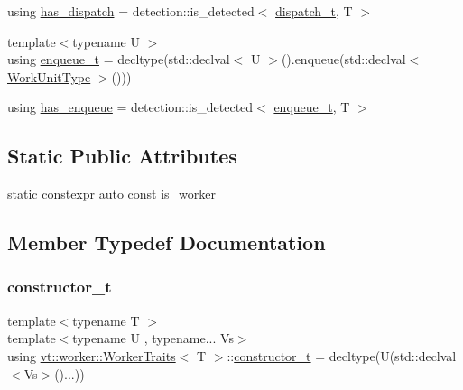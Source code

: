 \begin{DoxyCompactItemize}
\item 
using \hyperlink{structvt_1_1worker_1_1_worker_traits_adb7da9b18b2db529e85ed5a53ca0b0ea}{has\+\_\+dispatch} = detection\+::is\+\_\+detected$<$ \hyperlink{structvt_1_1worker_1_1_worker_traits_ae3d04fe828e40c570a63b969b982e5d4}{dispatch\+\_\+t}, T $>$
\item 
{\footnotesize template$<$typename U $>$ }\\using \hyperlink{structvt_1_1worker_1_1_worker_traits_a017de8e435dfce71e241f5288e199454}{enqueue\+\_\+t} = decltype(std\+::declval$<$ U $>$().enqueue(std\+::declval$<$ \hyperlink{namespacevt_1_1worker_a59d2fcdafa81fc0af7f921a258e42202}{Work\+Unit\+Type} $>$()))
\item 
using \hyperlink{structvt_1_1worker_1_1_worker_traits_acca4e6684b4853e34e9d586256968cb6}{has\+\_\+enqueue} = detection\+::is\+\_\+detected$<$ \hyperlink{structvt_1_1worker_1_1_worker_traits_a017de8e435dfce71e241f5288e199454}{enqueue\+\_\+t}, T $>$
\end{DoxyCompactItemize}
\subsection*{Static Public Attributes}
\begin{DoxyCompactItemize}
\item 
static constexpr auto const \hyperlink{structvt_1_1worker_1_1_worker_traits_af1a45fbd305afd463afd7314a04c0ae4}{is\+\_\+worker}
\end{DoxyCompactItemize}


\subsection{Member Typedef Documentation}
\mbox{\label{structvt_1_1worker_1_1_worker_traits_a37e115e6de3c0dce681e017d2bd0baab}} 
\subsubsection{\texorpdfstring{constructor\+\_\+t}{constructor\_t}}
{\footnotesize\ttfamily template$<$typename T $>$ \\
template$<$typename U , typename... Vs$>$ \\
using \hyperlink{structvt_1_1worker_1_1_worker_traits}{vt\+::worker\+::\+Worker\+Traits}$<$ T $>$\+::\hyperlink{structvt_1_1worker_1_1_worker_traits_a37e115e6de3c0dce681e017d2bd0baab}{constructor\+\_\+t} =  decltype(U(std\+::declval$<$Vs$>$()...))}

